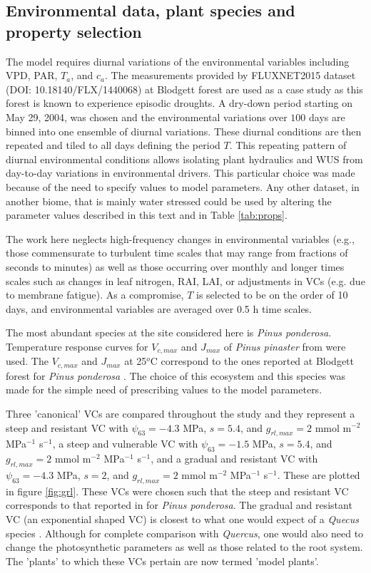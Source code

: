 \documentclass[utf8]{frontiersSCNS} %
\begin{document}
\subsection{Environmental data, plant species and property selection}

The model requires diurnal variations of the environmental variables including VPD, PAR, $T_a$, and $c_a$. The measurements provided by FLUXNET2015 dataset (DOI: 10.18140/FLX/1440068) at Blodgett forest are used as a case study as this forest is known to experience episodic droughts. A dry-down period starting on May 29, 2004, was chosen and the environmental variations over $100$ days are binned into one ensemble of diurnal variations. These diurnal conditions are then repeated and tiled to all days defining the period $T$. This repeating pattern of diurnal environmental conditions allows isolating plant hydraulics and WUS from day-to-day variations in environmental drivers. This particular choice was made because of the need to specify values to model parameters. Any other dataset, in another biome, that is mainly water stressed could be used by altering the parameter values described in this text and in Table \ref{tab:props}.

The work here neglects high-frequency changes in environmental variables (e.g., those commensurate to turbulent time scales that may range from fractions of seconds to minutes) as well as those occurring over monthly and longer times scales such as changes in leaf nitrogen, RAI, LAI, or adjustments in VCs (e.g. due to membrane fatigue). As a compromise, $T$ is selected to be on the order of 10 days, and environmental variables are averaged over 0.5 h time scales.

The most abundant species at the site considered here is \textit{Pinus ponderosa}. Temperature response curves for $V_{c,max}$ and $J_{max}$ of \textit{Pinus pinaster} from \citep{medlyn_temperature_2002} were used.  The $V_{c,max}$ and $J_{max}$ at 25$^o$C  correspond to the ones reported at Blodgett forest for \textit{Pinus ponderosa} \citep{panek2004ozone}. The choice of this ecosystem and this species was made for the simple need of prescribing values to the model parameters.

Three 'canonical' VCs are compared throughout the study and they represent a steep and resistant VC with $\psi_{63} = -4.3$ MPa, $s=5.4$, and $g_{rl,max} = 2$ mmol m$^{-2}$ MPa$^{-1}$ s$^{-1}$, a steep and vulnerable VC with $\psi_{63} = -1.5$ MPa, $s=5.4$, and $g_{rl,max} = 2$ mmol m$^{-2}$ MPa$^{-1}$ s$^{-1}$, and a gradual and resistant VC with $\psi_{63} = -4.3$ MPa, $s=2$, and $g_{rl,max} = 2$ mmol m$^{-2}$ MPa$^{-1}$ s$^{-1}$. These are plotted in figure \ref{fig:grl}. These VCs were chosen such that the steep and resistant VC corresponds to that reported in \citet{hubbard2001stomatal} for \textit{Pinus ponderosa}. The gradual and resistant VC (an exponential shaped VC) is closest to what one would expect of a \textit{Quecus} species \citep{christman_2012}. Although for complete comparison with \textit{Quercus}, one would also need to change the photosynthetic parameters as well as those related to the root system. The 'plants' to which these VCs pertain are now termed 'model plants'.
\end{document}
